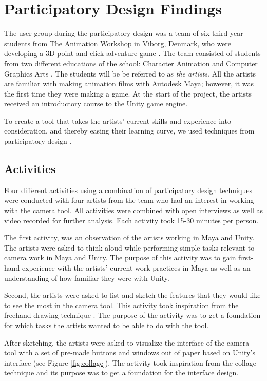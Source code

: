 \section{Participatory Design Findings} \label{PD_Findings}
The user group during the participatory design was a team of six third-year students from The Animation Workshop in Viborg, Denmark, who were developing a 3D point-and-click adventure game \cite{adventure_genre}. The team consisted of students from two different educations of the school: Character Animation and Computer Graphics Arts \cite{taw_degrees}. The students will be be referred to as \textit{the artists}. All the artists are familiar with making animation films with Autodesk Maya; however, it was the first time they were making a game. At the start of the project, the artists received an introductory course to the Unity game engine.

To create a tool that takes the artists' current skills and experience into consideration, and thereby easing their learning curve, we used techniques from participatory design \cite{part_design}.

\subsection{Activities}
Four different activities using a combination of participatory design techniques were conducted with four artists from the team who had an interest in working with the camera tool. All activities were combined with open interviews as well as video recorded for further analysis. Each activity took 15-30 minutes per person.

The first activity, was an observation \cite{part_design} of the artists working in Maya and Unity. The artists were asked to think-aloud \cite{part_design} while performing simple tasks relevant to camera work in Maya and Unity. The purpose of this activity was to gain first-hand experience with the artists' current work practices in Maya as well as an understanding of how familiar they were with Unity.

Second, the artists were asked to list and sketch the features that they would like to see the most in the camera tool. This activity took inspiration from the freehand drawing technique \cite{part_design}. The purpose of the activity was to get a foundation for which tasks the artists wanted to be able to do with the tool.

After sketching, the artists were asked to visualize the interface of the camera tool with a set of pre-made buttons and windows out of paper based on Unity's interface (see Figure \ref{fig:collage}). The activity took inspiration from the collage technique \cite{part_design} and its purpose was to get a foundation for the interface design.

